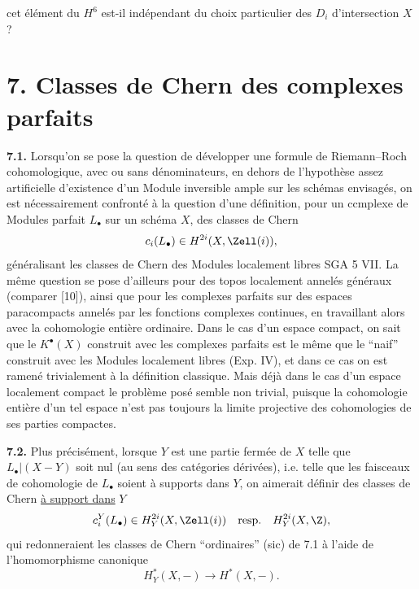 
cet
élément du $H^6$ est-il indépendant du choix particulier des $D_i$ d'intersection $X$?

\section*{7. Classes de Chern des complexes parfaits}

\textbf{7.1.} Lorsqu'on se pose la question de développer une formule de Riemann--Roch cohomologique, avec ou sans dénominateurs, en dehors de l'hypothèse assez artificielle d'existence d'un Module inversible ample sur les schémas envisagés, on est nécessairement confronté à la question d'une définition, pour un ccmplexe de Modules parfait $L_\bullet$ sur un schéma $X$, des classes de Chern
\[
 c_i(L_\bullet)\in H^{2i}(X,\Zell(i)),
\]
généralisant les classes de Chern des Modules localement libres SGA 5 VII. La même question se pose d'ailleurs pour des topos localement annelés généraux (comparer [10]), ainsi que pour les complexes parfaits sur des espaces paracompacts annelés par les fonctions complexes continues, en travaillant alors avec la cohomologie entière ordinaire. Dans le cas d'un espace compact, on sait que le $K^\bullet(X)$ construit avec les complexes parfaits est le même que le ``naif'' construit avec les Modules localement libres (Exp. IV), et dans ce cas on est ramené trivialement à la définition classique. Mais déjà dans le cas d'un espace localement compact le problème posé semble non trivial, puisque la cohomologie entière d'un tel espace n'est pas toujours la limite projective des cohomologies de ses parties compactes.

\textbf{7.2.} Plus précisément, lorsque $Y$ est une partie fermée de $X$ telle que $L_\bullet|(X-Y)$ soit nul (au sens des catégories dérivées), i.e. telle que les faisceaux de cohomologie de $L_\bullet$ soient à supports dans $Y$, on aimerait définir des classes de Chern \uline{à support dans} $Y$
\[
 c_i^Y(L_\bullet)\in H_Y^{2i}(X,\Zell(i))\quad\text{resp.}\quad H_Y^{2i}(X,\Z),
\]
qui redonneraient les classes de Chern ``ordinaires'' (sic) de 7.1 à l'aide de l'homomorphisme canonique
\[
 H_Y^*(X,-)\longrightarrow H^*(X,-).
\]
